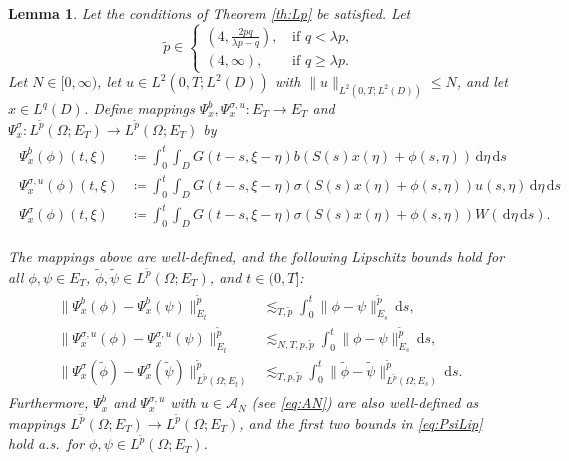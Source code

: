 \documentclass[10pt,a4paper]{amsart}
\newtheorem{lemma}[theorem]{Lemma}
\numberwithin{equation}{section}
\newcommand{\ceqq}{\coloneqq}
\newcommand{\col}{\colon}
\newcommand{\Om}{\Omega}
\newcommand{\A}{{\mathcal A}}
\newcommand{\dd}{\,\mathrm{d}}
\begin{document}
\begin{lemma}\label{lem:reg_ET}
Let the conditions of Theorem \ref{th:Lp} be satisfied. Let 
\[
\tilde{p}\in
\begin{cases}
(4,\frac{2pq}{\lambda p-q}), \, &\text{if } q<\lambda p,\\
(4,\infty), &\text{if } q\geq \lambda p. 
\end{cases}
\]  
Let  $N\in[0,\infty)$, let $u\in L^2(0,T;L^2(D))$ with $\|u\|_{L^2(0,T;L^2(D))}\leq N$, and let $x\in L^q(D)$. 
Define mappings $\Psi_x^b, \Psi_x^{\sigma,u}\col E_T \to E_T$  and $\Psi_x^\sigma\col L^{\tilde p}(\Om;E_T)\to L^{\tilde p}(\Om;E_T)$ by
\begin{align}\label{eq:defs Psi maps}
\begin{split}
    \Psi_x^b(\phi)(t,\xi) &\ceqq\int_0^t \int_D G(t-s,\xi-\eta) b(S(s)x(\eta) + \phi(s,\eta))\dd\eta \dd s\\
    \Psi_x^{\sigma,u}(\phi)(t,\xi) &\ceqq \int_0^t \int_D G(t-s,\xi-\eta) \sigma(S(s)x(\eta) + \phi(s,\eta) )u(s,\eta) \dd\eta \dd s\\
    \Psi_x^\sigma(\phi)(t,\xi) &\ceqq \int_0^t \int_D G(t-s,\xi-\eta) \sigma(S(s)x(\eta) + \phi(s,\eta))W(\dd\eta \dd s).
    \end{split}
\end{align}  

The mappings above are well-defined, and the following Lipschitz bounds hold for all   $\phi,\psi \in E_T$,   $\tilde\phi,\tilde\psi\in L^{\tilde p}(\Om;E_T)$, and $t\in(0,T]$:
\begin{align}\label{eq:PsiLip}
\begin{split}
\|\Psi_x^{b}(\phi)-\Psi_x^{b}(\psi)\|_{E_t}^{\tilde{p}} 
    &\lesssim_{T,\tilde p} \int_0^t \|\phi-\psi\|_{E_s}^{\tilde{p}}\dd s,\\ 
    \|\Psi_x^{\sigma,u}(\phi)-\Psi_x^{\sigma,u}(\psi)\|_{E_t}^{\tilde p} 
    &\lesssim_{N,T,p,\tilde p} \int_0^t \|\phi-\psi\|_{E_s}^{\tilde p} \dd s,\\ 
    \|\Psi_x^{\sigma}(\tilde\phi)-\Psi_x^{\sigma}(\tilde\psi)\|_{L^{\tilde{p}}(\Om;E_t)}^{\tilde{p}}
    &\lesssim_{T,p,\tilde p} \int_0^t \|\tilde\phi-\tilde\psi\|_{L^{\tilde{p}}(\Om;E_s)}^{\tilde{p}}\dd s.  
 \end{split}
 \end{align}   
Furthermore,  $\Psi_x^b$ and $\Psi_x^{\sigma,u}$ with $u\in \A_N$ (see \eqref{eq:AN}) are also well-defined as mappings $L^{\tilde p}(\Om;E_T)\to L^{\tilde p}(\Om;E_T)$, and the first two bounds in \eqref{eq:PsiLip} hold a.s.\ for $\phi,\psi\in L^{\tilde p}(\Om;E_T)$. 
\end{lemma} 
\end{document}
